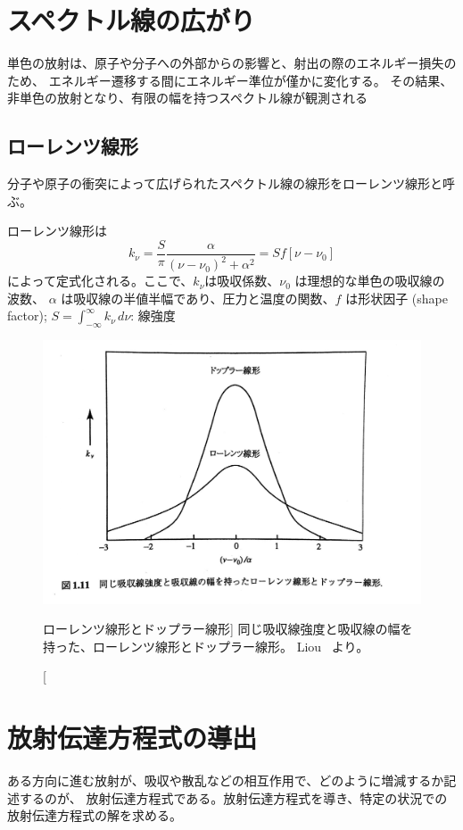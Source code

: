 \documentclass[article,twoside]{dennou777}
\begin{document}
\section{スペクトル線の広がり}
単色の放射は、原子や分子への外部からの影響と、射出の際のエネルギー損失のため、
エネルギー遷移する間にエネルギー準位が僅かに変化する。
その結果、非単色の放射となり、有限の幅を持つスペクトル線が観測される

\subsection{ローレンツ線形}
分子や原子の衝突によって広げられたスペクトル線の線形をローレンツ線形と呼ぶ。

ローレンツ線形は
\begin{equation}
	k_\nu=\frac{S}{\pi}\frac{\alpha}{(\nu-\nu_0)^2+\alpha^2}=Sf[\nu-\nu_0]
\end{equation}
によって定式化される。ここで、$k_\nu$は吸収係数、$\nu_0$ は理想的な単色の吸収線の波数、
$\alpha$ は吸収線の半値半幅であり、圧力と温度の関数、$f$ は形状因子 (shape factor);\quad
$\displaystyle S=\int^\infty_{-\infty}k_\nu\,d\nu$: 線強度

\begin{figure}[t]
	\includegraphics[width=\textwidth]{lorentz.jpg}
	\caption
		[ローレンツ線形とドップラー線形]
		{
			同じ吸収線強度と吸収線の幅を持った、ローレンツ線形とドップラー線形。
			Liou~\cite{liou} より。
		}
\end{figure}


\section{放射伝達方程式の導出}
ある方向に進む放射が、吸収や散乱などの相互作用で、どのように増減するか記述するのが、
放射伝達方程式である。放射伝達方程式を導き、特定の状況での放射伝達方程式の解を求める。
\end{document}
